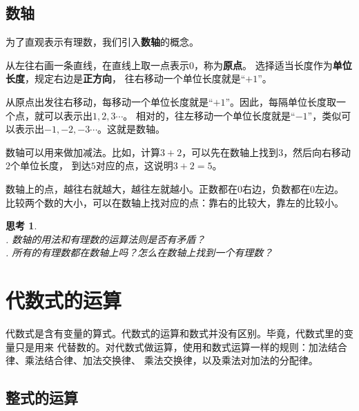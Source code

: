 \documentclass[12pt,UTF8]{ctexbook}
\theoremstyle{definition}
\theoremstyle{plain}
\newtheorem{sk}{思考}[section]
\begin{document}
\section{数轴}
为了直观表示有理数，我们引入\textbf{数轴}的概念。

从左往右画一条直线，在直线上取一点表示$0$，称为\textbf{原点}。
选择适当长度作为\textbf{单位长度}，规定右边是\textbf{正方向}，
往右移动一个单位长度就是“$+1$”。

从原点出发往右移动，每移动一个单位长度就是“$+1$”。因此，每隔单位长度取一个点，就可以表示出$1,2,3\cdots$。
相对的，往左移动一个单位长度就是“$-1$”，类似可以表示出$-1,-2,-3\cdots$。这就是数轴。

数轴可以用来做加减法。比如，计算$3+2$，可以先在数轴上找到$3$，然后向右移动$2$个单位长度，
到达$5$对应的点，这说明$3+2=5$。

数轴上的点，越往右就越大，越往左就越小。正数都在$0$右边，负数都在$0$左边。
比较两个数的大小，可以在数轴上找对应的点：靠右的比较大，靠左的比较小。

\begin{sk}\label{sk:3-2-0}
    \mbox{} \\
    . 数轴的用法和有理数的运算法则是否有矛盾？\\
    . 所有的有理数都在数轴上吗？怎么在数轴上找到一个有理数？
\end{sk}

\chapter{代数式的运算}
代数式是含有变量的算式。代数式的运算和数式并没有区别。毕竟，代数式里的变量只是用来
代替数的。对代数式做运算，使用和数式运算一样的规则：加法结合律、乘法结合律、加法交换律、
乘法交换律，以及乘法对加法的分配律。

\section{整式的运算}
\end{document}
